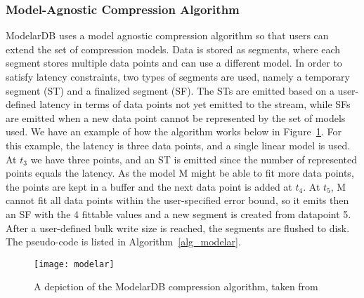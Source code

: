 \subsubsection{Model-Agnostic Compression Algorithm}
ModelarDB uses a model agnostic compression algorithm so that users can extend the set of
compression models. Data is stored as segments, where each segment stores multiple data
points and can use a different model. In order to satisfy latency constraints, two types
of segments are used, namely a temporary segment (ST) and a finalized segment (SF).
The STs are emitted based on a user-defined latency in terms of data points not yet
emitted to the stream, while SFs are emitted when a new data point cannot be represented
by the set of models used.
We have an example of how the algorithm works below in Figure~\ref{modelar}. For this example,
the latency is three data points, and a single linear model is used. At $t_3$  we have three
points, and an ST is emitted since the number of represented points equals the latency.
As the model M might be able to fit more data points, the points are kept in a buffer and
the next data point is added at $t_4$. At $t_5$, M cannot fit all data points within the
user-specified error bound, so it emits then an SF with the 4 fittable values and a
new segment is created from datapoint 5. After a user-defined bulk write size is
reached,  the segments are flushed to disk.
The pseudo-code is listed in Algorithm~\ref{alg_modelar}.
\begin{figure}
\begin{center}
\texttt{[image: modelar]}
\caption[modelar]{A depiction of the ModelarDB compression algorithm, taken from \cite{jensen2018modelardb}}
\label{modelar}
\end{center}
\end{figure}
